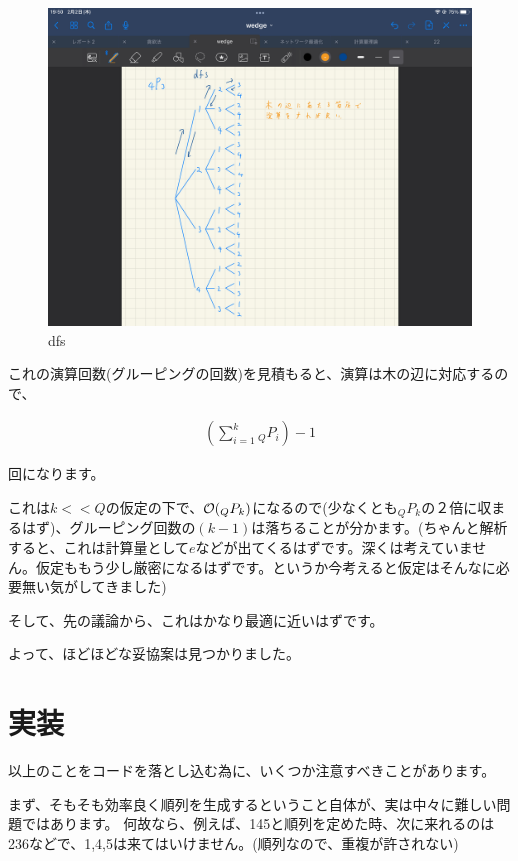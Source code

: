 \documentclass[a4paper, 10pt, dvipdfmx]{jlreq}
\begin{document}
\begin{figure}[htbp]
    \begin{center}
        \includegraphics[width=150mm]{dfs.jpg}
        \caption{dfs}
        \label{img:dfs}
    \end{center}
\end{figure}

これの演算回数(グルーピングの回数)を見積もると、演算は木の辺に対応するので、

\begin{align*}
    \left(\sum_{i=1}^{k} {}_Q P_i \right) - 1
\end{align*}

回になります。

これは$k<<Q$の仮定の下で、$\order{{}_Q P_k}$になるので(少なくとも${}_Q P_k$の$２$倍に収まるはず)、グルーピング回数の$(k-1)$は落ちることが分かます。(ちゃんと解析すると、これは計算量として$e$などが出てくるはずです。深くは考えていません。仮定ももう少し厳密になるはずです。というか今考えると仮定はそんなに必要無い気がしてきました)

そして、先の議論から、これはかなり最適に近いはずです。

よって、ほどほどな妥協案は見つかりました。

\section{実装}

以上のことをコードを落とし込む為に、いくつか注意すべきことがあります。

まず、そもそも効率良く順列を生成するということ自体が、実は中々に難しい問題ではあります。
何故なら、例えば、145と順列を定めた時、次に来れるのは236などで、1,4,5は来てはいけません。(順列なので、重複が許されない)
\end{document}
